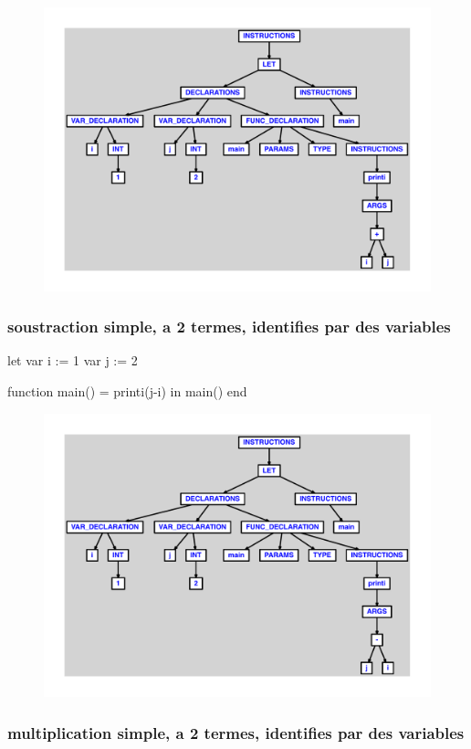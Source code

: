 \documentclass{article}
\begin{document}
\begin{figure}[H]\centering\includegraphics[max width=\textwidth]{ast/ast_51.pdf}\end{figure}\subsubsection{soustraction simple, a 2 termes, identifies par des variables}
\begin{verbatimtab}
let
	var i := 1
	var j := 2

	function main() = printi(j-i)
in main() end
\end{verbatimtab}
\begin{figure}[H]\centering\includegraphics[max width=\textwidth]{ast/ast_52.pdf}\end{figure}\subsubsection{multiplication simple, a 2 termes, identifies par des variables}
\end{document}
